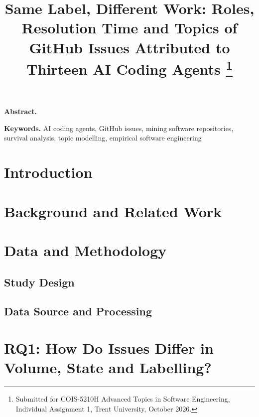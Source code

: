 \documentclass[conference]{IEEEtran}
\begin{document}
\IEEEoverridecommandlockouts  %
\title{Same Label, Different Work: Roles, Resolution Time and Topics of GitHub Issues Attributed to Thirteen AI Coding Agents%
\thanks{Submitted for COIS-5210H Advanced Topics in Software Engineering, Individual Assignment 1, Trent University, October 2026.}}
\author{
}
\maketitle

{\small\noindent\textbf{Abstract.} \par}
\medskip
{\small\noindent\textbf{Keywords.} AI coding agents, GitHub issues, mining software repositories, survival analysis, topic modelling, empirical software engineering\par}
\medskip

\section{Introduction}


\section{Background and Related Work}


\section{Data and Methodology}\label{sec:method}
\subsection{Study Design}


\subsection{Data Source and Processing}


\section{RQ1: How Do Issues Differ in Volume, State and Labelling?}\label{sec:rq1}

\end{document}
